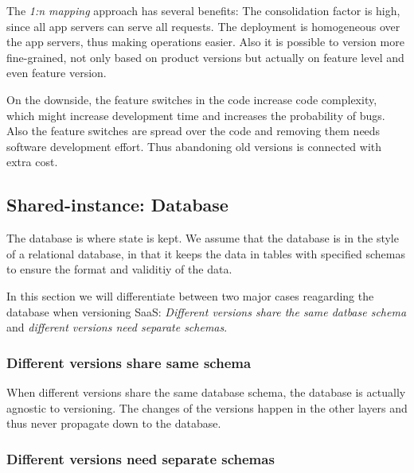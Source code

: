 The \emph{1:n mapping} approach has several benefits: The consolidation factor is high, since all app servers can serve all requests. The deployment is homogeneous over the app servers, thus making operations easier. Also it is possible to version more fine-grained, not only based on product versions but actually on feature level and even feature version.

On the downside, the feature switches in the code increase code complexity, which might increase development time and increases the probability of bugs. Also the feature switches are spread over the code and removing them needs software development effort. Thus abandoning old versions is connected with extra cost.

%
%
%

\subsection{Shared-instance: Database}

The database is where state is kept. We assume that the database is in the style of a relational database, in that it keeps the data in tables with specified schemas to ensure the format and validitiy of the data.

In this section we will differentiate between two major cases reagarding the database when versioning SaaS: \emph{Different versions share the same datbase schema} and \emph{different versions need separate schemas}.

\subsubsection{Different versions share same schema}

When different versions share the same database schema, the database is actually agnostic to versioning. The changes of the versions happen in the other layers and thus never propagate down to the database.

\subsubsection{Different versions need separate schemas}

